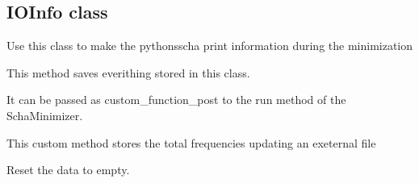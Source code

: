 \documentclass[a4paper,11pt,english]{sphinxmanual}
\begin{document}
\subsection{IOInfo class}
\label{\detokenize{apireference:ioinfo-class}}
\sphinxAtStartPar
Use this class to make the python\sphinxhyphen{}sscha print information during the minimization

\begin{fulllineitems}
\label{\detokenize{apireference:sscha.Utilities.IOInfo}}
\pysigstartsignatures
{}
\pysigstopsignatures{}

\begin{fulllineitems}
\label{\detokenize{apireference:sscha.Utilities.IOInfo.CFP_SaveAll}}
\pysigstartsignatures
{}
\pysigstopsignatures
\sphinxAtStartPar
This method saves everithing stored in this class.

\sphinxAtStartPar
It can be passed as custom\_function\_post to the run method of the SchaMinimizer.

\end{fulllineitems}


\begin{fulllineitems}
\label{\detokenize{apireference:sscha.Utilities.IOInfo.CFP_SaveFrequencies}}
\pysigstartsignatures
{}
\pysigstopsignatures
\sphinxAtStartPar
This custom method stores the total frequencies updating an exeternal file

\end{fulllineitems}


\begin{fulllineitems}
\label{\detokenize{apireference:sscha.Utilities.IOInfo.Reset}}
\pysigstartsignatures
{}
\pysigstopsignatures
\sphinxAtStartPar
Reset the data to empty.


\end{fulllineitems}
\end{fulllineitems}
\end{document}
